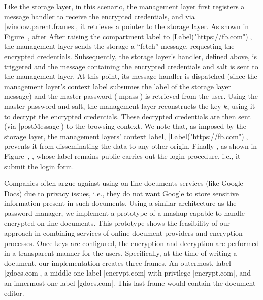 Like the storage layer, in this scenario, the management layer first
registers a message handler to receive the encrypted credentials, and
via \js|window.parent.frames|, it retrieves a pointer to the storage
layer.
%
\iffigures
As shown in Figure~, after 
\else
After
\fi
raising the
compartment label to \js|Label("https://fb.com")|, the management
layer sends the storage a ``fetch'' message, requesting the encrypted
credentials.
%
%
Subsequently, the storage layer's handler, defined above, is triggered
and the message containing the encrypted
credentials and salt is sent to the management layer.
%
At this point, its message handler is dispatched (since the management
layer's context label subsumes the label of the storage layer message)
and the master password (\js|mpass|) is retrieved from the user. 
%
Using the master password and salt, the management layer reconstructs
the key $k$, using it to decrypt the encrypted credentials.
%
These decrypted credentials are then sent (via \js|postMessage|) to
the  browsing context.
%
We note that, as imposed by the storage layer, the management layers'
context label, \js|Label("https://fb.com")|, prevents it from
disseminating the data to any other origin.
%
Finally
\iffigures
, as shown in Figure~, 
\fi
{},
whose label remains public carries out the login procedure, i.e., it
submit the login form.

Companies often argue against using on-line documents services (like Google
Docs) due to privacy issues, i.e., they do not want Google to store sensitive
information present in such documents. Using a similar architecture as the
password manager, we implement a prototype of a mashup capable to handle
encrypted on-line documents. This prototype shows the feasibility of our
approach in combining services of online document providers and encryption
processes. Once keys are configured, the encryption and decryption are
performed in a transparent manner for the users. Specifically, at the time of
writing a document, our implementation creates three frames. An outermost,
label \js|gdocs.com|, a middle one label \js|encrypt.com| with privilege
\js|encrypt.com|, and an innermost one label \js|gdocs.com|. This last 
frame would contain the document editor. 

